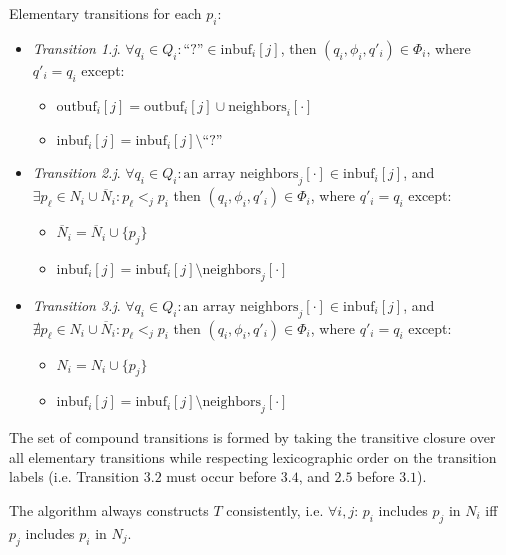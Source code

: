 Elementary transitions for each $p_i$:
\begin{itemize}
\item \emph{Transition 1.j}. $\forall q_i \in Q_i: \text{``?''} \in \text{inbuf}_i[j]$, then $(q_i, \phi_i, q'_i) \in \Phi_i$,
      where $q'_i = q_i$ except:
      \begin{itemize}
      \item $\text{outbuf}_i[j] = \text{outbuf}_i[j] \cup \text{neighbors}_i[\cdot]$
      \item $\text{inbuf}_i[j] = \text{inbuf}_i[j] \setminus \text{``?''}$
      \end{itemize}
\item \emph{Transition 2.j}. $\forall q_i \in Q_i: \text{an array neighbors}_j[\cdot] \in \text{inbuf}_i[j]$,
      and $\exists p_{\ell} \in N_i \cup \overline{N}_i: p_{\ell} <_j p_i$
      then $(q_i, \phi_i, q'_i) \in \Phi_i$,
      where $q'_i = q_i$ except:
      \begin{itemize}
      \item $\overline{N}_i = \overline{N}_i \cup \{ p_j \}$
      \item $\text{inbuf}_i[j] = \text{inbuf}_i[j] \setminus \text{neighbors}_j[\cdot]$
      \end{itemize}
\item \emph{Transition 3.j}. $\forall q_i \in Q_i: \text{an array neighbors}_j[\cdot] \in \text{inbuf}_i[j]$,
      and $\nexists p_{\ell} \in N_i \cup \overline{N}_i: p_{\ell} <_j p_i$
      then $(q_i, \phi_i, q'_i) \in \Phi_i$,
      where $q'_i = q_i$ except:
      \begin{itemize}
      \item $N_i = N_i \cup \{ p_j \}$
      \item $\text{inbuf}_i[j] = \text{inbuf}_i[j] \setminus \text{neighbors}_j[\cdot]$
      \end{itemize}
\end{itemize}

The set of compound transitions is formed by taking the transitive closure over all elementary
transitions while respecting lexicographic order on the transition labels (i.e. Transition $3.2$
must occur before $3.4$, and $2.5$ before $3.1$).

\begin{theorem} \label{thm:tconsistent}
The algorithm always constructs $T$ consistently, i.e. $\forall i, j$:
$p_i$ includes $p_j$ in $N_i$ iff $p_j$ includes $p_i$ in $N_j$.
\end{theorem}

